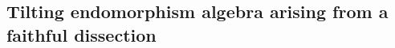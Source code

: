 \documentclass[a4paper,10pt]{amsart}
\theoremstyle{plain}          %
\theoremstyle{definition}
\def\PP{\mathbf{P}}
\begin{document}








\subsection{Tilting endomorphism algebra arising from a faithful dissection}
\end{document}
